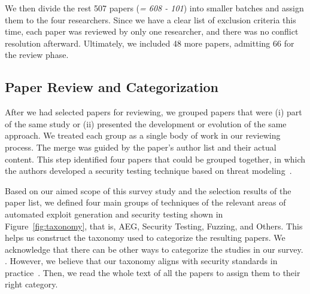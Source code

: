We then divide the rest 507 papers (\textit{= 608 - 101}) into smaller batches and assign them to the four researchers. Since we have a clear list of exclusion criteria this time, each paper was reviewed by only one researcher, and there was no conflict resolution afterward. Ultimately, we included 48 more papers, admitting 66 for the review phase.

\subsection{Paper Review and Categorization}
\label{sec:paper-organization}



After we had selected papers for reviewing, we grouped papers that were (i) part of the same study or (ii) presented the development or evolution of the same approach.
We treated each group as a single body of work in our reviewing process.
The merge was guided by the paper's author list and their actual content.
{}
{}
This step identified four papers that could be grouped together, in which the authors developed a security testing technique based on threat modeling~\cite{xu2011tool,xu2012automated,marback2013threat,Xu2015247}.

Based on our aimed scope of this survey study and the selection results of the paper list, we defined four main groups of techniques of the relevant areas of automated exploit generation and security testing shown in Figure~\ref{fig:taxonomy}, that is, AEG, Security Testing, Fuzzing, and Others.
This helps us construct the taxonomy used to categorize the resulting papers.
We acknowledge that there can be other ways to categorize the studies in our survey.
{}
{ .}
However, we believe that our taxonomy aligns with security standards in practice~\cite{pendleton2016survey}.
Then, we read the whole text of all the papers to assign them to their right category.
{}
{}


